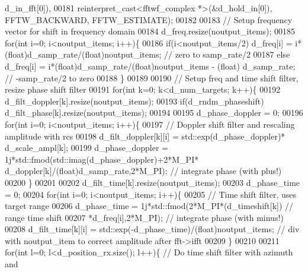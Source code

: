 \begin{DoxyCode}
      d_in_fft[0]),
00181                     reinterpret\_cast<fftwf\_complex *>(&d_hold_in[0]), FFTW\_BACKWARD, FFTW\_ESTIMATE);
00182 
00183             \textcolor{comment}{// Setup frequency vector for shift in frequency domain}
00184             d_freq.resize(noutput\_items);
00185             \textcolor{keywordflow}{for}(\textcolor{keywordtype}{int} i=0; i<noutput\_items; i++)\{
00186                 \textcolor{keywordflow}{if}(i<noutput\_items/2) d_freq[i] = i*(float)d_samp_rate/(\textcolor{keywordtype}{float})noutput\_items; \textcolor{comment}{// zero to
       samp\_rate/2}
00187                 \textcolor{keywordflow}{else} d_freq[i] = i*(float)d_samp_rate/(\textcolor{keywordtype}{float})noutput\_items - (float)
      d_samp_rate; \textcolor{comment}{// -samp\_rate/2 to zero}
00188             \}
00189 
00190             \textcolor{comment}{// Setup freq and time shift filter, resize phase shift filter}
00191             \textcolor{keywordflow}{for}(\textcolor{keywordtype}{int} k=0; k<d_num_targets; k++)\{
00192                 d_filt_doppler[k].resize(noutput\_items);
00193                 \textcolor{keywordflow}{if}(d_rndm_phaseshift) d_filt_phase[k].resize(noutput\_items);
00194 
00195                 d_phase_doppler = 0;
00196                 \textcolor{keywordflow}{for}(\textcolor{keywordtype}{int} i=0; i<noutput\_items; i++)\{
00197                     \textcolor{comment}{// Doppler shift filter and rescaling amplitude with rcs}
00198                     d_filt_doppler[k][i] = std::exp(d_phase_doppler)*
      d_scale_ampl[k];
00199                     d_phase_doppler = 1j*std::fmod(std::imag(d_phase_doppler)+2*M\_PI*
      d_doppler[k]/(\textcolor{keywordtype}{float})d_samp_rate,2*M\_PI); \textcolor{comment}{// integrate phase (with plus!)}
00200                 \}
00201 
00202                 d_filt_time[k].resize(noutput\_items);
00203                 d_phase_time = 0;
00204                 \textcolor{keywordflow}{for}(\textcolor{keywordtype}{int} i=0; i<noutput\_items; i++)\{
00205                     \textcolor{comment}{// Time shift filter, uses target range}
00206                     d_phase_time = 1j*std::fmod(2*M\_PI*(d_timeshift[k]) \textcolor{comment}{// range time shift}
00207                             *d_freq[i],2*M\_PI); \textcolor{comment}{// integrate phase (with minus!)}
00208                     d_filt_time[k][i] = std::exp(-d_phase_time)/(float)noutput\_items; \textcolor{comment}{// div with
       noutput\_item to correct amplitude after fft->ifft}
00209                 \}
00210 
00211                 \textcolor{keywordflow}{for}(\textcolor{keywordtype}{int} l=0; l<d_position_rx.size(); l++)\{ \textcolor{comment}{// Do time shift filter with azimuth and
}
\end{DoxyCode}
